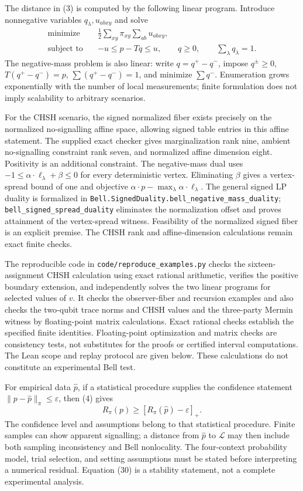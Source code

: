 \documentclass[
]{article}
\begin{document}
The distance in (3) is computed by the following linear program. Introduce nonnegative variables \(q_\lambda,u_{abxy}\) and solve
\[
\begin{aligned}
\text{minimize}\quad &\frac12\sum_{xy}\pi_{xy}\sum_{ab}u_{abxy},\\
\text{subject to}\quad &-u\le p-Tq\le u,\qquad
q\ge0,\qquad \sum_\lambda q_\lambda=1.
\end{aligned}
\tag{29}
\]
The negative-mass problem is also linear: write \(q=q^+-q^-\), impose \(q^\pm\ge0\), \(T(q^+-q^-)=p\), \(\sum(q^+-q^-)=1\), and minimize \(\sum q^-\). Enumeration grows exponentially with the number of local measurements; finite formulation does not imply scalability to arbitrary scenarios.

For the CHSH scenario, the signed normalized fiber exists precisely on the normalized no-signalling affine space, allowing signed table entries in this affine statement. The supplied exact checker gives marginalization rank nine, ambient no-signalling constraint rank seven, and normalized affine dimension eight. Positivity is an additional constraint. The negative-mass dual uses \(-1\le\alpha\cdot\ell_\lambda+\beta\le0\) for every deterministic vertex. Eliminating \(\beta\) gives a vertex-spread bound of one and objective \(\alpha\cdot p-\max_\lambda\alpha\cdot\ell_\lambda\). The general signed LP duality is formalized in \texttt{Bell.SignedDuality.bell\_negative\_mass\_duality}; \texttt{bell\_signed\_spread\_duality} eliminates the normalization offset and proves attainment of the vertex-spread witness. Feasibility of the normalized signed fiber is an explicit premise. The CHSH rank and affine-dimension calculations remain exact finite checks.

The reproducible code in \texttt{code/reproduce\_examples.py} checks the sixteen-assignment CHSH calculation using exact rational arithmetic, verifies the positive boundary extension, and independently solves the two linear programs for selected values of \(v\). It checks the observer-fiber and recursion examples and also checks the two-qubit trace norms and CHSH values and the three-party Mermin witness by floating-point matrix calculations. Exact rational checks establish the specified finite identities. Floating-point optimization and matrix checks are consistency tests, not substitutes for the proofs or certified interval computations. The Lean scope and replay protocol are given below. These calculations do not constitute an experimental Bell test.

For empirical data \(\widehat p\), if a statistical procedure supplies the confidence statement \(\|p-\widehat p\|_\pi\le\varepsilon\), then (4) gives
\[
R_\pi(p)\ge[R_\pi(\widehat p)-\varepsilon]_+.
\tag{30}
\]
The confidence level and assumptions belong to that statistical procedure. Finite samples can show apparent signalling; a distance from \(\widehat p\) to \(\mathcal L\) may then include both sampling inconsistency and Bell nonlocality. The four-context probability model, trial selection, and setting assumptions must be stated before interpreting a numerical residual. Equation (30) is a stability statement, not a complete experimental analysis.
\end{document}
